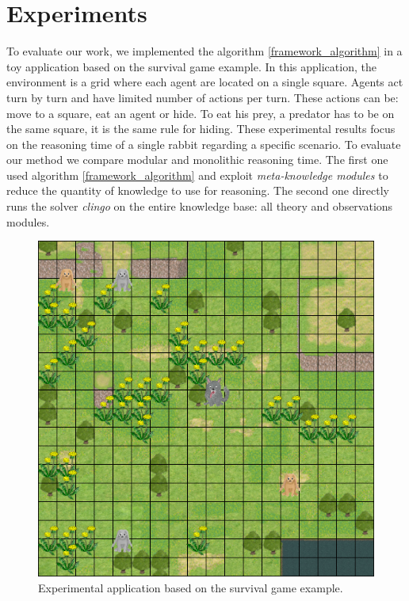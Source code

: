 \documentclass{aamas2012}
\begin{document}
\section{Experiments}

	To evaluate our work, we implemented the algorithm \ref{framework_algorithm} in a toy application based on the survival game example.
	In this application, the environment is a grid where each agent are located on a single square.
	Agents act turn by turn and have limited number of actions per turn.
	These actions can be: move to a square, eat an agent or hide.
	To eat his prey, a predator has to be on the same square, it is the same rule for hiding.
	These experimental results focus on the reasoning time of a single rabbit regarding a specific scenario.
	To evaluate our method we compare modular and monolithic reasoning time.
	The first one used algorithm \ref{framework_algorithm} and exploit \emph{meta-knowledge modules} to reduce the quantity of knowledge to use for reasoning.
	The second one directly runs the solver \emph{clingo} on the entire knowledge base: all theory and observations modules.
	
	\begin{figure}
		\centering
		\includegraphics[keepaspectratio=true, scale=0.45]{application.png}
		\caption
		{
			\label{application}
			Experimental application based on the survival game example.
		}
	\end{figure}
	
\end{document}
